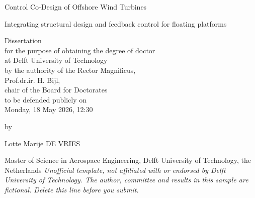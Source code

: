 \begin{titlepage}
\centering
{\LARGE Control Co-Design of Offshore Wind Turbines\par}
\vspace{0.2in}
{\large Integrating structural design and feedback control for floating platforms\par}
\vspace{1in}
Dissertation\\
for the purpose of obtaining the degree of doctor\\
at Delft University of Technology\\
by the authority of the Rector Magnificus,\\
Prof.dr.ir. H. Bijl,\\
chair of the Board for Doctorates\\
to be defended publicly on\\
Monday, 18 May 2026, 12:30\par
\vspace{0.3in}
by\par
\vspace{0.3in}
Lotte Marije DE VRIES\par
\vspace{0.2in}
Master of Science in Aerospace Engineering, Delft University of Technology, the Netherlands
\vfill
{\footnotesize\itshape Unofficial template, not affiliated with or endorsed by Delft University of Technology. The author, committee and results in this sample are fictional. Delete this line before you submit.}
\end{titlepage}


